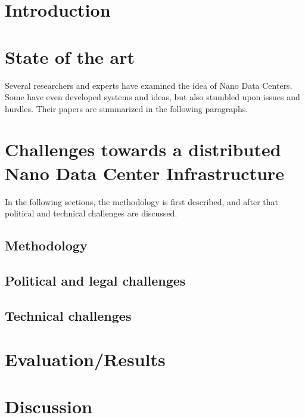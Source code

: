 
\section{Introduction}


\section{State of the art}
Several researchers and experts have examined the idea of Nano Data Centers. Some have even developed systems and ideas, but also stumbled upon issues and hurdles. Their papers are summarized in the following paragraphs. 


\section{Challenges towards a distributed Nano Data Center Infrastructure}
In the following sections, the methodology is first described, and after that political and technical challenges are discussed. 

\subsection{Methodology}



\subsection{Political and legal challenges}


\subsection{Technical challenges}


\section{Evaluation/Results}


\section{Discussion}


